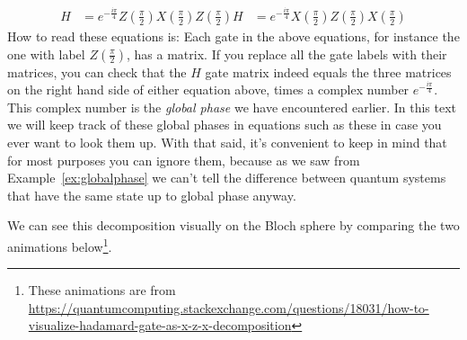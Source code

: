 \documentclass{article}
\theoremstyle{definition}
\begin{document}
\begin{align}
	H &= e^{-\frac{i\pi}{4}} Z\left(\frac{\pi}{2}\right) X\left(\frac{\pi}{2}\right) Z\left(\frac{\pi}{2}\right)
	H &= e^{-\frac{i\pi}{4}} X\left(\frac{\pi}{2}\right) Z\left(\frac{\pi}{2}\right) X\left(\frac{\pi}{2}\right)
\end{align}
How to read these equations is: Each gate in the above equations, for instance the one with label $Z\left(\frac{\pi}{2}\right)$, has a matrix.
If you replace all the gate labels with their matrices, you can check that the $H$ gate matrix indeed equals the three matrices on the right hand side of either equation above, times a complex number $e^{-\frac{i\pi}{4}}$.  This complex number is the \textit{global phase} we have encountered earlier.  In this text we will keep track of these global phases in equations such as these in case you ever want to look them up.  With that said, it's convenient to keep in mind that for most purposes you can ignore them, because as we saw from Example~\ref{ex:globalphase} we can't tell the difference between quantum systems that have the same state up to global phase anyway.

We can see this decomposition visually on the Bloch sphere by comparing the two animations below\footnote{These animations are from \url{https://quantumcomputing.stackexchange.com/questions/18031/how-to-visualize-hadamard-gate-as-x-z-x-decomposition}}.
\noindent%
\begin{minipage}[t]{0.45\linewidth}
	\begin{frame}{}
	\end{frame}\end{minipage}%
\hfill%
\begin{minipage}[t]{0.45\linewidth}
	\begin{frame}{}
	\end{frame}
\end{minipage}


\end{document}
